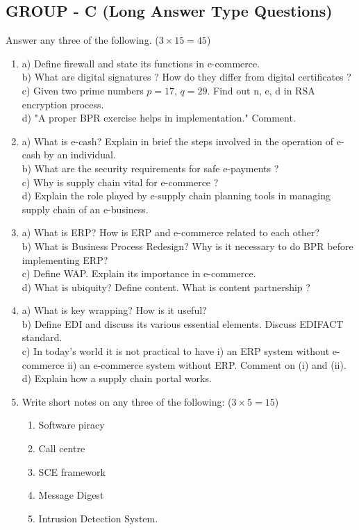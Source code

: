 \documentclass{article}
\begin{document}
\subsection*{GROUP - C (Long Answer Type Questions)}
Answer any three of the following. ($3 \times 15 = 45$)
\begin{enumerate}
    \item[7.] 
    a) Define firewall and state its functions in e-commerce. \\
    b) What are digital signatures ? How do they differ from digital certificates ? \\
    c) Given two prime numbers $p=17$, $q=29$. Find out n, e, d in RSA encryption process. \\
    d) "A proper BPR exercise helps in implementation." Comment.
    \item[8.] 
    a) What is e-cash? Explain in brief the steps involved in the operation of e-cash by an individual. \\
    b) What are the security requirements for safe e-payments ? \\
    c) Why is supply chain vital for e-commerce ? \\
    d) Explain the role played by e-supply chain planning tools in managing supply chain of an e-business.
    \item[9.] 
    a) What is ERP? How is ERP and e-commerce related to each other? \\
    b) What is Business Process Redesign? Why is it necessary to do BPR before implementing ERP? \\
    c) Define WAP. Explain its importance in e-commerce. \\
    d) What is ubiquity? Define content. What is content partnership ?
    \item[10.] 
    a) What is key wrapping? How is it useful? \\
    b) Define EDI and discuss its various essential elements. Discuss EDIFACT standard. \\
    c) In today's world it is not practical to have i) an ERP system without e-commerce ii) an e-commerce system without ERP. Comment on (i) and (ii). \\
    d) Explain how a supply chain portal works.
    \item[11.] Write short notes on any three of the following: ($3 \times 5 = 15$)
    \begin{enumerate}
        \item[a)] Software piracy
        \item[b)] Call centre
        \item[c)] SCE framework
        \item[d)] Message Digest
        \item[e)] Intrusion Detection System.
    \end{enumerate}
\end{enumerate}
\end{document}
